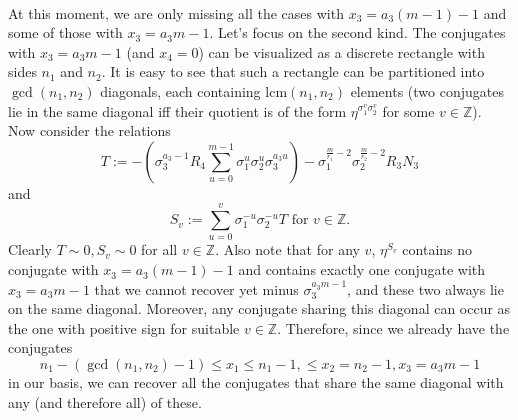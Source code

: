 \documentclass[12pt,a4paper]{article}
\theoremstyle{definition}
\newcommand{\Z}{\mathbb{Z}}
\newcommand{\lcm}{\mathrm{lcm}}
\begin{document}
\paragraph*{}
At this moment, we are only missing all the cases with $x_3=a_3(m-1)-1$ and some of those with $x_3=a_3m-1$. 
Let's focus on the second kind. The conjugates with $x_3=a_3m-1$ (and $x_4=0$) can be visualized as a discrete rectangle with sides $n_1$ and $n_2$. It is easy to see that such a rectangle can be partitioned into $\gcd(n_1,n_2)$ diagonals, each containing $\lcm(n_1,n_2)$ elements (two conjugates lie in the same diagonal iff their quotient is of the form $\eta^{\sigma_1^v\sigma_2^v}$ for some $v\in\Z$). Now consider the relations $$T:=-\left(\sigma_3^{a_3-1}R_4\sum_{u=0}^{m-1}\sigma_1^{u}\sigma_2^{u}\sigma_3^{a_3u}\right)-\sigma_1^{\frac{m}{r_1}-2}\sigma_2^{\frac{m}{r_2}-2} R_3N_3$$
and
$$S_v:=\sum_{u=0}^{v}\sigma_1^{-u}\sigma_2^{-u}T \text{ for } v\in\Z.$$
Clearly $T\sim 0, S_v\sim 0$ for all $v\in\Z$. Also note that for any $v$, $\eta^{S_v}$ contains no conjugate with $x_3=a_3(m-1)-1$ and contains exactly one conjugate with $x_3=a_3m-1$ that we cannot recover yet minus $\sigma_3^{a_3m-1}$, and these two always lie on the same diagonal. Moreover, any conjugate sharing this diagonal can occur as the one with positive sign for suitable $v\in\Z$. Therefore, since we already have the conjugates $$n_1-(\gcd\left(n_1,n_2\right)-1)\leq x_1\leq n_1-1, \leq x_2=n_2-1, x_3=a_3m-1$$ in our basis, we can recover all the conjugates that share the same diagonal with any (and therefore all) of these.
\end{document}
